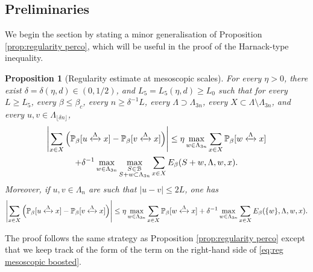 \documentclass[11pt,a4paper]{article}
\numberwithin{equation}{section}
\theoremstyle{plain}
\newtheorem{Prop}[Thm]{Proposition}
\theoremstyle{definition}
\newcommand{\connect}{\xleftrightarrow}
\begin{document}
\subsection{Preliminaries}
We begin the section by stating a minor generalisation of Proposition \ref{prop:regularity perco}, which will be useful in the proof of the Harnack-type inequality.
\begin{Prop}[Regularity estimate at mesoscopic scales]\label{prop:regularitygeneralperco} For every $\eta>0$, there exist $\delta=\delta(\eta,d)\in(0,1/2)$, and $L_5=L_5(\eta,d)\geq L_0$ such that for every $L\geq L_5$, every $\beta\leq \beta_c$, every $n\geq \delta^{-1}L$, every $\Lambda\supset \Lambda_{3n}$, every $X\subset \Lambda\setminus\Lambda_{3n}$, and every $u,v\in \Lambda_{\lfloor \delta n\rfloor}$,
\begin{multline}\label{eq:reg mesoscopic boosted}
\left|\sum_{x\in X}\Big(\mathbb P_\beta[u\connect{\Lambda\:}x]-\mathbb P_\beta[v\connect{\Lambda\:}x]\Big)\right|\le \eta\max_{w\in \Lambda_{3n}}
\sum_{x\in X}\mathbb P_\beta[w\connect{\Lambda\:}x]\\+\delta^{-1}\max_{w\in \Lambda_{3n}}\max_{\substack{S\in \mathcal B\\S+w\subset \Lambda_{3n}}}\sum_{x\in X}E_\beta(S+w,\Lambda,w,x).
\end{multline}
Moreover, if $u,v \in \Lambda_n$ are such that $|u-v|\leq 2L$, one has
\begin{equation}\label{eq:uv close in the statement}
	\left|\sum_{x\in X}\Big(\mathbb P_\beta[u\connect{\Lambda\:}x]-\mathbb P_\beta[v\connect{\Lambda\:}x]\Big)\right|\le \eta\max_{w\in \Lambda_{3n}}
\sum_{x\in X}\mathbb P_\beta[w\connect{\Lambda\:}x]\\+\delta^{-1}\max_{w\in \Lambda_{3n}}\sum_{x\in X}E_\beta(\{w\},\Lambda,w,x).
\end{equation}
\end{Prop}
The proof follows the same strategy as Proposition \ref{prop:regularity perco} except that we keep track of the form of the term on the right-hand side of \eqref{eq:reg mesoscopic boosted}. 
\end{document}
